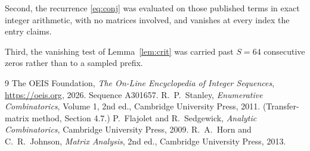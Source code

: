 \documentclass[11pt,a4paper]{article}
\theoremstyle{plain}
\theoremstyle{definition}
\begin{document}
Second, the recurrence \eqref{eq:conj} was evaluated on those published terms in exact
integer arithmetic, with no matrices involved, and vanishes at every index the entry claims.

Third, the vanishing test of Lemma~\ref{lem:crit} was carried past $S=64$ consecutive
zeros rather than to a sampled prefix.

\begin{thebibliography}{9}
 The OEIS Foundation, \emph{The On-Line Encyclopedia of Integer
Sequences}, \url{https://oeis.org}, 2026. Sequence A301657.
 R.~P.~Stanley, \emph{Enumerative Combinatorics}, Volume 1, 2nd ed.,
Cambridge University Press, 2011. (Transfer-matrix method, Section 4.7.)
 P.~Flajolet and R.~Sedgewick, \emph{Analytic Combinatorics}, Cambridge
University Press, 2009.
 R.~A.~Horn and C.~R.~Johnson, \emph{Matrix Analysis}, 2nd ed., Cambridge
University Press, 2013.
\end{thebibliography}
\end{document}
